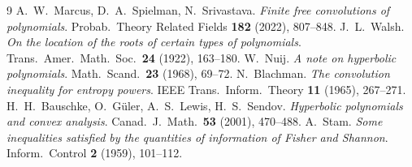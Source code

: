 \documentclass[11pt]{article}
\theoremstyle{definition}
\begin{document}
\begin{thebibliography}{9}
 A.~W.~Marcus, D.~A.~Spielman, N.~Srivastava.
  \emph{Finite free convolutions of polynomials}.
  Probab.\ Theory Related Fields \textbf{182} (2022), 807--848.
 J.~L.~Walsh.
  \emph{On the location of the roots of certain types of polynomials}.
  Trans.\ Amer.\ Math.\ Soc.\ \textbf{24} (1922), 163--180.
 W.~Nuij.
  \emph{A note on hyperbolic polynomials}.
  Math.\ Scand.\ \textbf{23} (1968), 69--72.
 N.~Blachman.
  \emph{The convolution inequality for entropy powers}.
  IEEE Trans.\ Inform.\ Theory \textbf{11} (1965), 267--271.
 H.~H.~Bauschke, O.~G\"uler, A.~S.~Lewis, H.~S.~Sendov.
  \emph{Hyperbolic polynomials and convex analysis}.
  Canad.\ J.\ Math.\ \textbf{53} (2001), 470--488.
 A.~Stam.
  \emph{Some inequalities satisfied by the quantities of information of Fisher
  and Shannon}. Inform.\ Control \textbf{2} (1959), 101--112.
\end{thebibliography}
\end{document}
